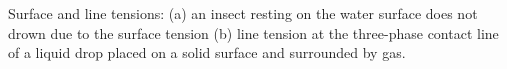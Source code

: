 \label{fig:Surf-and-line-tension}Surface and line tensions: (a)
an insect resting on the water surface does not drown due to the surface
tension (b) line tension at the three-phase contact line of a liquid
drop placed on a solid surface and surrounded by gas.